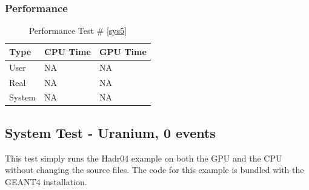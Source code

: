 \documentclass[12pt]{article}
\begin{document}
	\subsubsection{Performance}
		\begin{table}[!htbp]
		\centering
		\caption{Performance Test \# \ref{sys5}}\label{_acc}
		\begin{tabular}{lll}
		\toprule
		Type&CPU Time& GPU Time\\\midrule
		User&NA&NA\\
		Real&NA&NA\\
		System&NA&NA\\
		\end{tabular}
		\end{table}
		
\subsection{System Test - Uranium, 0 events}
This test simply runs the Hadr04 example on both the GPU and the CPU without changing the source files. The code for this example is bundled with the GEANT4 installation.\\
\break
\end{document}
